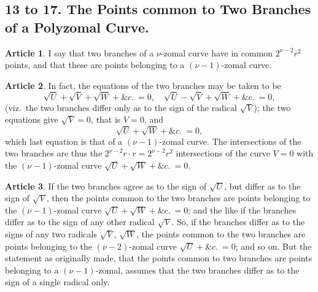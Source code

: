 \documentclass[11pt,a4paper]{article}
\theoremstyle{definition}
\newtheorem{art}{Article}
\begin{document}
\subsection*{13 to 17. The Points common to Two Branches of a Polyzomal Curve.}

\begin{art}
I say that two branches of a $\nu$-zomal curve have in common $2^{\nu-2}r^{2}$ points, and that these are points belonging to a $(\nu - 1)$-zomal curve.
\end{art}

\begin{art}
In fact, the equations of the two branches may be taken to be
\[
\sqrt{U} + \sqrt{V} + \sqrt{W} + \&c.\ = 0, \quad \sqrt{U} - \sqrt{V} + \sqrt{W} + \&c.\ = 0,
\]
(viz.\ the two branches differ only as to the sign of the radical $\sqrt{V}$); the two equations give $\sqrt{V} = 0$, that is $V = 0$, and
\[
\sqrt{U} + \sqrt{W} + \&c.\ = 0,
\]
which last equation is that of a $(\nu - 1)$-zomal curve. The intersections of the two branches are thus the $2^{\nu-2}r \cdot r = 2^{\nu-2}r^{2}$ intersections of the curve $V = 0$ with the $(\nu - 1)$-zomal curve $\sqrt{U} + \sqrt{W} + \&c.\ = 0$.
\end{art}

\begin{art}
If the two branches agree as to the sign of $\sqrt{U}$, but differ as to the sign of $\sqrt{V}$, then the points common to the two branches are points belonging to the $(\nu - 1)$-zomal curve $\sqrt{U} + \sqrt{W} + \&c.\ = 0$; and the like if the branches differ as to the sign of any other radical $\sqrt{V}$. So, if the branches differ as to the signs of any two radicals $\sqrt{V}$, $\sqrt{W}$, the points common to the two branches are points belonging to the $(\nu - 2)$-zomal curve $\sqrt{U} + \&c.\ = 0$; and so on. But the statement as originally made, that the points common to two branches are points belonging to a $(\nu - 1)$-zomal, assumes that the two branches differ as to the sign of a single radical only.
\end{art}
\end{document}
